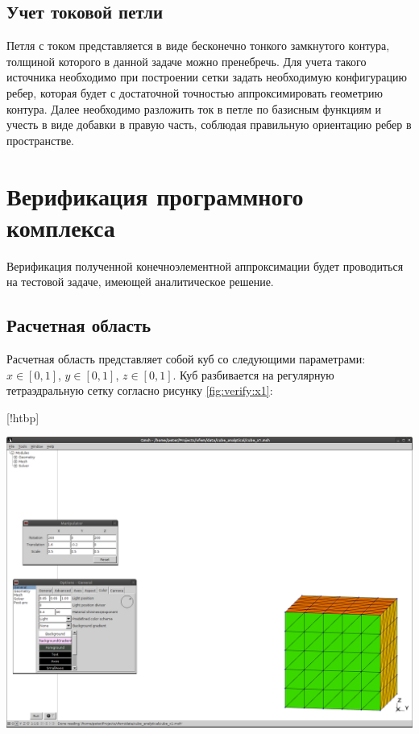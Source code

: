 \documentclass[a4paper,14pt]{article}
\makeatletter
\renewenvironment{figure}[1][\fps@figure]{
  \edef\@tempa{\noexpand\@float{figure}[#1]}
  \@tempa
  \addtocounter{foofigure}{1}
}{
  \end@float
}
\makeatother
\begin{document}

\subsection{Учет токовой петли}
Петля с током представляется в виде бесконечно тонкого замкнутого контура, толщиной которого в данной задаче можно пренебречь. Для учета такого источника необходимо при построении сетки задать необходимую конфигурацию ребер, которая будет с достаточной точностью аппроксимировать геометрию контура. Далее необходимо разложить ток в петле по базисным функциям и учесть в виде добавки в правую часть, соблюдая правильную ориентацию ребер в пространстве.


\clearpage
\section{Верификация программного комплекса}
Верификация полученной конечноэлементной аппроксимации будет проводиться на тестовой задаче, имеющей аналитическое решение.
\subsection{Расчетная область}
Расчетная область представляет собой куб со следующими параметрами: $x \in [0,1]$, $y \in [0,1]$, $z \in [0,1]$. Куб разбивается на регулярную тетраэдральную сетку согласно рисунку \ref{fig:verify:x1}:

\begin{figure}[!htbp]
	\centering
	\includegraphics[trim=387mm 20mm 5mm 220mm,clip,scale=0.4]{verify/x1.png}
	\caption{конечноэлементная сетка для верификации}
	\label{fig:verify:x1}
\end{figure}
\end{document}
